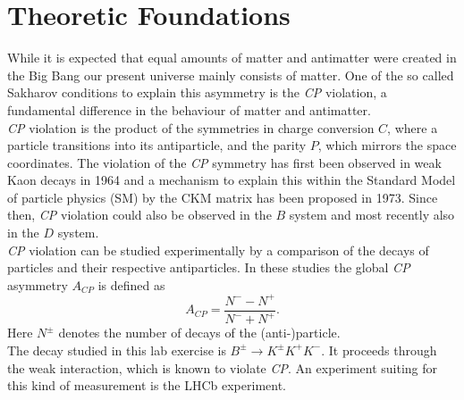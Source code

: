 \section{Theoretic Foundations}
\label{sec:Theorie}
While it is expected that equal amounts of matter and antimatter were created in the Big Bang our present universe mainly consists of matter. One of the so called Sakharov conditions to explain this asymmetry is the \textit{CP} violation, a fundamental difference in the behaviour of matter and antimatter\cite{Sakharov_1991}.\\

\textit{CP} violation is the product of the symmetries in charge conversion $C$, where a particle transitions into its antiparticle, and the parity $P$, which mirrors the space coordinates.
The violation of the \textit{CP} symmetry has first been observed in weak Kaon decays in 1964\cite{PhysRevLett.13.138} and a mechanism to explain this within the Standard Model of particle physics (SM) by the CKM matrix has been proposed in 1973\cite{10.1143/PTP.49.652}.
Since then, \textit{CP} violation could also be observed in the $B$ system\cite{Aubert_2001} and most recently also in the $D$ system\cite{PhysRevLett.122.211803}.\\

\textit{CP} violation can be studied experimentally by a comparison of the decays of particles and their respective antiparticles. In these studies the global \textit{CP} asymmetry $A_{CP}$ is defined as
\begin{equation}
  A_{CP} = \frac{N^- - N^+}{N^- + N^+}.
  \label{eq1}
\end{equation}
Here $N^{\pm}$ denotes the number of decays of the (anti-)particle.\\

The decay studied in this lab exercise is $B^{\pm} \to K^{\pm} K^+ K^-$. It proceeds through the weak interaction, which is known to violate \textit{CP}. An experiment suiting for this kind of measurement is the LHCb experiment\cite{Collaboration_2008}.

